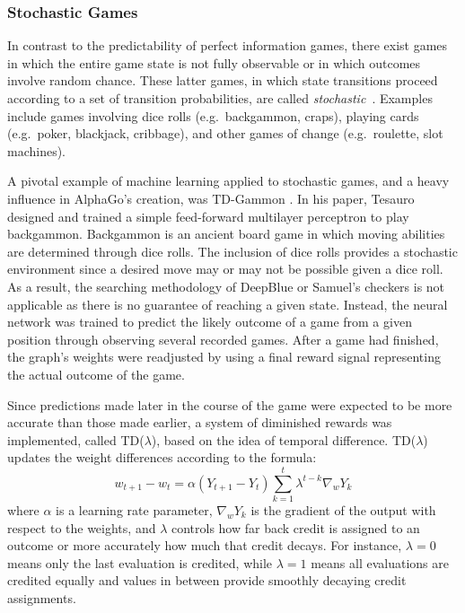 

\subsubsection*{Stochastic Games}


In contrast to the predictability of perfect information games,
there exist games in which the entire game state is not fully observable
or in which outcomes involve random chance.
%
These latter games,
in which state transitions
proceed according to a set of transition probabilities,
are called \textit{stochastic}~\cite{stochastic_games}.
%
Examples include games involving
dice rolls (e.g.\ backgammon, craps),
playing cards (e.g.\ poker, blackjack, cribbage),
and other games of change (e.g.\ roulette, slot machines).


A pivotal example of machine learning applied to stochastic games,
and a heavy influence in AlphaGo's creation,
was TD-Gammon
\cite{tdgammon}.
%
In his paper,
Tesauro designed and trained a simple feed-forward multilayer perceptron to play 
backgammon.
%
Backgammon is an ancient board game in which moving abilities are determined
through dice rolls.
%
The inclusion of dice rolls provides a stochastic environment since
a desired move may or may not be possible given a dice roll.
%
As a result,
the searching methodology of DeepBlue or Samuel's checkers is not applicable
as there is no guarantee of reaching a given state.
%
Instead,
the neural network was trained to predict the likely outcome of a game from a
given position
through observing several recorded games.
%
After a game had finished,
the graph's weights were readjusted by using a final reward signal representing
the actual outcome of the game.

Since predictions made later in the course of the game were expected to be more
accurate than those made earlier,
a system of diminished rewards was implemented,
called TD($\lambda$),
based on the idea of temporal difference.
%
TD($\lambda$) updates the weight differences according to the formula:
\[
	w_{t+1} - w_t =
		\alpha (Y_{t+1}-Y_t)
		\sum_{k=1}^t {\lambda^{t-k} \nabla_w Y_k}
\]
where $\alpha$ is a learning rate parameter,
$\nabla_w Y_k$ is the gradient of the output with respect to the weights,
and $\lambda$ controls how far back credit is assigned to an outcome
or more accurately how much that credit decays.
%
For instance,
$\lambda=0$ means only the last evaluation is credited,
while $\lambda=1$ means all evaluations are credited equally
and values in between provide smoothly decaying credit assignments.

